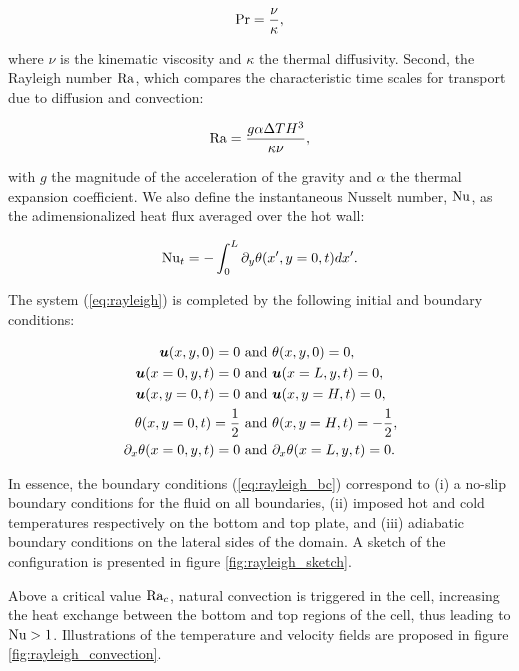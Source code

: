 \begin{equation*}
	\text{Pr} = \frac{\nu}{\kappa},
\end{equation*}

where $\nu$ is the kinematic viscosity and $\kappa$ the thermal diffusivity. Second, the Rayleigh number $\text{Ra}$, which compares the characteristic time scales for transport due to diffusion and convection:

\begin{equation*}
	\text{Ra} = \frac{g \alpha \Delta T H^3}{\kappa \nu},
\end{equation*}

with $g$ the magnitude of the acceleration of the gravity and $\alpha$ the thermal expansion coefficient. We also define the instantaneous Nusselt number, $\text{Nu}$, as the adimensionalized heat flux averaged over the hot wall:

\begin{equation}
\label{eq:nusselt}
	\text{Nu}_t = - \int_{0}^{L} \partial_y \theta (x',y=0,t) dx'.
\end{equation}

The system (\ref{eq:rayleigh}) is completed by the following initial and boundary conditions:

\begin{equation}
\label{eq:rayleigh_bc}
\begin{split}
	\bm{u}(x,y,0)	= 0 &\text{ and } \theta(x,y,0)	= 0, \\
	\bm{u}(x=0,y,t)	= 0 &\text{ and } \bm{u}(x=L,y,t) = 0, \\
	\bm{u}(x,y=0,t)	= 0 &\text{ and } \bm{u}(x,y=H,t) = 0, \\
	\theta(x,y=0,t) 	= \frac{1}{2} &\text{ and } \theta(x,y=H,t) =-\frac{1}{2}, \\
	\partial_x \theta(x=0,y,t) = 0 &\text{ and } \partial_x \theta(x=L,y,t) = 0.
\end{split}
\end{equation}

In essence, the boundary conditions (\ref{eq:rayleigh_bc}) correspond to (i) a no-slip boundary conditions for the fluid on all boundaries, (ii) imposed hot and cold temperatures respectively on the bottom and top plate, and (iii) adiabatic boundary conditions on the lateral sides of the domain. A sketch of the configuration is presented in figure \ref{fig:rayleigh_sketch}.



Above a critical value $\text{Ra}_c$, natural convection is triggered in the cell, increasing the heat exchange between the bottom and top regions of the cell, thus leading to $\text{Nu} > 1$. Illustrations of the temperature and velocity fields are proposed in figure \ref{fig:rayleigh_convection}.

